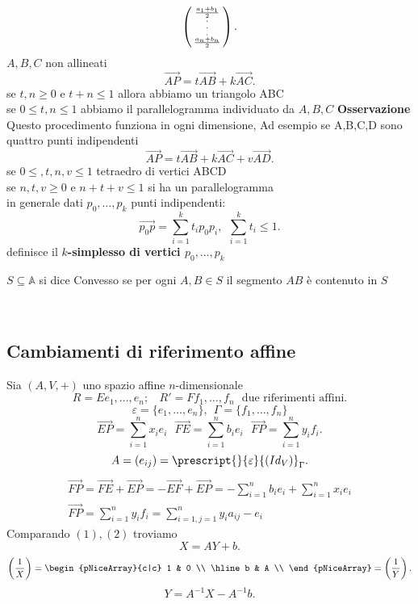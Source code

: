 \documentclass[12px]{article}
\begin{document}
	\[
		\left(\begin{smallmatrix}\frac{a_1+b_1}{2}\\.\\.\\.\\\frac{a_n + b_n}{2}\end{smallmatrix}\right)
	.\] 
	$A,B,C$ non allineati
	\[
	\overrightarrow{AP} = t\overrightarrow{AB} + k\overrightarrow{AC}
	.\] 
	se $t,n \geq 0$ e $t + n\leq 1$ allora abbiamo un triangolo ABC\\
	se $0\leq t,n \leq 1$ abbiamo il parallelogramma individuato da $A,B,C$
	\textbf{Osservazione}\\
	Questo procedimento funziona in ogni dimensione, Ad esempio se A,B,C,D sono quattro punti indipendenti
	\[
	\overrightarrow{AP} = t\overrightarrow{AB} + k\overrightarrow{AC} + v\overrightarrow{AD}
	.\] 
	se $0\leq,t,n,v\leq 1$ tetraedro di vertici ABCD\\
	se $n,t,v\geq 0$ e $n+t+v\leq 1$ si ha un parallelogramma\\
	in generale dati $p_0,\ldots,p_k$ punti indipendenti:\\
	\[
	\overrightarrow{p_0p} = \sum^k_{i=1}t_ip_0p_i, \ \ \sum^k_{i=1}t_i \leq 1
	.\] 
	definisce il \textbf{$k$-simplesso di vertici $p_0,\ldots,p_k$}\\
	\begin{defi}
	$S\subseteq \mathbb{A} $ si dice Convesso se per ogni $A,B\in S$ il segmento $AB$ è contenuto in $S$
\end{defi}
\
\subsection{Cambiamenti di riferimento affine}
Sia $(A,V,+)$ uno spazio affine $n$-dimensionale
\[
	R = Ee_1,\ldots,e_n;\ \ \ \ R'= Ff_1,\ldots,f_n \ \ \ \text{due riferimenti affini}
.\] 
\[
	\varepsilon = \{e_1,\ldots,e_n\}, \ \ \Gamma = \{f_1,\ldots,f_n\}
\]
\[
\overrightarrow{EP} = \sum^n_{i=1}x_ie_i\ \ \ \overrightarrow{FE} = \sum^n_{i=1}b_ie_i \ \ \ \overrightarrow{FP} = \sum^n_{i=1}y_if_i
.\] 
\[
	A = (e_{ij}) = \prescript{}{\varepsilon}{(Id_V)}_\Gamma
.\] 
\begin{gather}
\overrightarrow{FP} = \overrightarrow{FE} + \overrightarrow{EP} = -\overrightarrow{EF} + \overrightarrow{EP} = -\sum^n_{i=1}b_ie_i + \sum^n_{i=1}x_ie_i\\
\overrightarrow{FP} = \sum^n_{i=1}y_if_i = \sum^n_{i=1, j=1}y_ia_{ij}-e_i
\end{gather}
Comparando $(1),(2)$ troviamo \[
X = AY + b
.\] 
\[
	\left(\frac{1}{X}\right) = \begin{pNiceArray}{c|c}
		1 & 0 \\
		\hline
		b & A \\ 
	\end{pNiceArray} = \left(\frac{1}{Y}\right)
.\] 
\[
	Y = A^{-1}X - A^{-1}b
.\] 
\end{document}
